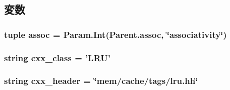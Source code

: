 \subsection{変数}
\hypertarget{classTags_1_1LRU_a19c16ab1fbe2e2d958dbfd7213149cfc}{
\subsubsection[{assoc}]{\setlength{\rightskip}{0pt plus 5cm}tuple {\bf assoc} = Param.Int(Parent.assoc, \char`\"{}associativity\char`\"{})}}
\label{classTags_1_1LRU_a19c16ab1fbe2e2d958dbfd7213149cfc}
\hypertarget{classTags_1_1LRU_a58cd55cd4023648e138237cfc0822ae3}{
\subsubsection[{cxx\_\-class}]{\setlength{\rightskip}{0pt plus 5cm}string {\bf cxx\_\-class} = '{\bf LRU}'}}
\label{classTags_1_1LRU_a58cd55cd4023648e138237cfc0822ae3}
\hypertarget{classTags_1_1LRU_a17da7064bc5c518791f0c891eff05fda}{
\subsubsection[{cxx\_\-header}]{\setlength{\rightskip}{0pt plus 5cm}string {\bf cxx\_\-header} = \char`\"{}mem/cache/tags/lru.hh\char`\"{}}}
\label{classTags_1_1LRU_a17da7064bc5c518791f0c891eff05fda}


